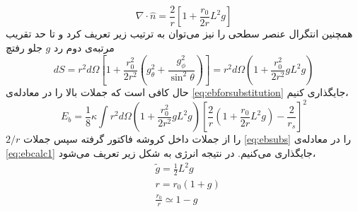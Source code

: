 \begin{equation}
\nabla\cdot\hat n =\frac{2}{r}\left[1+\frac{r_0}{2r}L^2g\right]
\label{eq:divnL2}
\end{equation}
همچنین انتگرال عنصر سطحی را نیز می‌توان به ترتیب زیر تعریف کرد و تا حد تقریب مرتبه‌ی دوم رد $g$ جلو رفتچ
\begin{equation}
dS=r^2d\Omega\left[1+\frac{r_0^2}{2r^2}\left(g_\theta^2+\frac{g_\phi^2}{\sin^2\theta}\right)\right]=r^2d\Omega\left(1+\frac{r_0^2}{2r^2}gL^2g\right)
\label{eq:dsL2}
\end{equation}
حال کافی است که جملات بالا را در معادله‌ی \ref{eq:ebforsubstitution} جایگذاری کنیم،
\begin{equation}
E_b=\frac{1}{8}\kappa\int r^2d\Omega\left(1+\frac{r_0^2}{2r^2}gL^2g\right)\left[\frac{2}{r}\left(1+\frac{r_0}{2r}L^2g\right)-\frac{2}{r_s}\right]^2
\label{eq:ebcalc1}
\end{equation}
 $2/r$ را از جملات داخل کروشه فاکتور گرفته سپس جملات 
 \ref{eq:ebsubs}
 را در معادله‌ی
 \ref{eq:ebcalc1}
 جایگذاری می‌کنیم‌. در نتیجه انرژی به شکل زیر تعریف می‌شود،
\begin{equation}
\begin{aligned}
&\tilde{g}=\frac{1}{2}L^2g\\
&r=r_0(1+g)\\
&\frac{r_0}{r}\simeq 1-g
\label{eq:ebsubs}
\end{aligned}
\end{equation}



